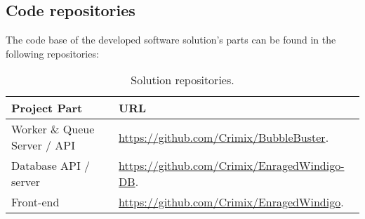 % 
% 

\subsection{Code repositories}
The code base of the developed software solution's parts can be found in the
following repositories:

\begin{table}[H]
\centering
\begin{tabular}{|l|p{6cm}|}
\hline
\textbf{Project Part} & \textbf{URL} \\ \hline
Worker \& Queue Server / \acs{API}  & \url{https://github.com/Crimix/BubbleBuster}.\\\hline 
Database \acs{API} / server & \url{https://github.com/Crimix/EnragedWindigo-DB}.\\\hline 
Front-end & \url{https://github.com/Crimix/EnragedWindigo}.
\\\hline
\end{tabular}
\caption{Solution repositories.}
\end{table}